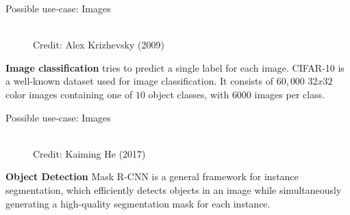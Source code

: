 \begin{frame} {Possible use-case: Images}
\begin{figure}
\centering
{}
\\
\tiny{Credit: Alex Krizhevsky (2009)}
\end{figure}
\textbf{Image classification} tries to predict a single label for each image.
\footnotesize CIFAR-10 is a well-known dataset used for image classification. It consists of $60,000$ $32x32$ color images containing one of $10$ object classes, with $6000$ images per class. 
\end{frame}

\begin{frame} {Possible use-case: Images}
\begin{figure}
\centering
{}
\\
\tiny{Credit: Kaiming He (2017)}
\end{figure}
\textbf{Object Detection}
\footnotesize Mask R-CNN is a general framework for instance segmentation, which efficiently detects objects in an image while simultaneously generating a high-quality segmentation mask for each instance.
\end{frame}

